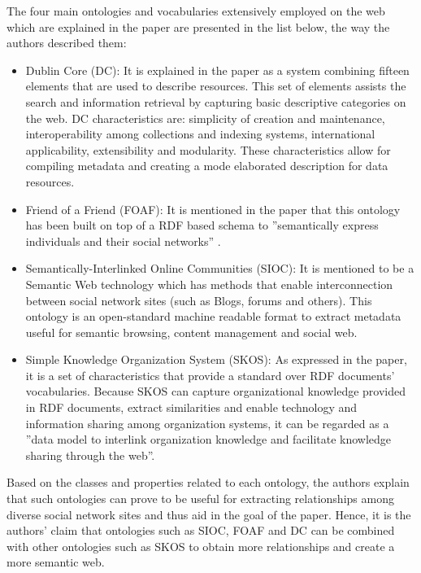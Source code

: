 \documentclass[10pt,journal,compsoc]{IEEEtran}
\begin{document}
The four main ontologies and vocabularies extensively employed on the web which are explained in the paper are presented in the list below, the way the authors described them:
\begin{itemize}
\item Dublin Core (DC): It is explained in the paper as a system combining fifteen elements that are used to describe resources. This set of elements assists the search and information retrieval by capturing basic descriptive categories on the web. DC characteristics are: simplicity of creation and maintenance, interoperability among collections and indexing systems, international applicability, extensibility and modularity. These characteristics allow for compiling metadata and creating a mode elaborated description for data resources.

\item Friend of a Friend (FOAF): It is mentioned in the paper that this ontology has been built on top of a RDF based schema to 
''semantically express individuals and their social networks'' \cite{6190504}.

\item Semantically-Interlinked Online Communities (SIOC): It is mentioned to be a Semantic Web technology which has methods that enable interconnection between social network sites (such as Blogs, forums and others). This ontology is an open-standard machine readable format to extract metadata useful for semantic browsing, content management and social web.

\item Simple Knowledge Organization System (SKOS): As expressed in the paper, it is a set of characteristics that provide a standard over RDF documents' vocabularies. Because SKOS can capture organizational knowledge provided in RDF documents, extract similarities and enable technology and information sharing among organization systems, it can be regarded as a ''data model to interlink organization knowledge and facilitate knowledge sharing through the web''\cite{6190504}.


\end{itemize}




Based on the classes and properties related to each ontology, the authors explain that such ontologies can prove to be useful for extracting relationships among diverse social network sites and thus aid in the goal of the paper. Hence, it is the authors' claim that ontologies such as SIOC, FOAF and DC can be combined with other ontologies such as SKOS to obtain more relationships and create a more semantic web.
\end{document}
